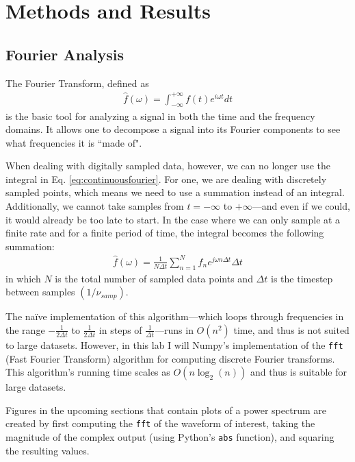 \documentclass[12pt]{article}
\begin{document}
\section{Methods and Results}

\subsection{Fourier Analysis}
The Fourier Transform, defined as
\begin{eqnarray}
\hat{f}(\omega) = \int_{-\infty}^{+\infty}f(t)e^{i\omega t} dt \label{eq:continuousfourier}
\end{eqnarray}
is the basic tool for analyzing a signal in both the time and the frequency domains. It allows one to decompose a signal into its Fourier components to see what frequencies it is ``made of".

When dealing with digitally sampled data, however, we can no longer use the integral in Eq. \ref{eq:continuousfourier}. For one, we are dealing with discretely sampled points, which means we need to use a summation instead of an integral. Additionally, we cannot take samples from $t=-\infty$ to $+\infty$---and even if we could, it would already be too late to start. In the case where we can only sample at a finite rate and for a finite period of time, the integral becomes the following summation:
\begin{eqnarray}
\hat{f}(\omega) = \frac{1}{N\Delta{t}}\sum_{n=1}^{N} f_n e^{j\omega n \Delta{t}} \Delta{t}
\end{eqnarray}
in which $N$ is the total number of sampled data points and $\Delta{t}$ is the timestep between samples $\left( 1/\nu_{samp} \right)$.

The na\"{i}ve implementation of this algorithm---which loops through frequencies in the range $-\frac{1}{2\Delta{t}}$ to $\frac{1}{2\Delta{t}}$ in steps of $\frac{1}{\Delta{t}}$---runs in $O\left(n^2\right)$ time, and thus is not suited to large datasets. However, in this lab I will Numpy's implementation of the \texttt{fft} (Fast Fourier Transform) algorithm for computing discrete Fourier transforms. This algorithm's running time scales as $O\left( n \log_2(n) \right)$ and thus is suitable for large datasets.

Figures in the upcoming sections that contain plots of a power spectrum are created by first computing the \texttt{fft} of the waveform of interest, taking the magnitude of the complex output (using Python's \texttt{abs} function), and squaring the resulting values.
\end{document}
